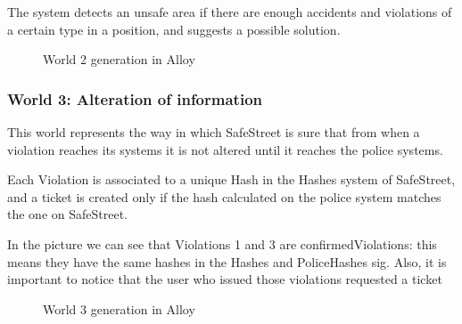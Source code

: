 The system detects an unsafe area if there are enough accidents and violations of a certain type in a position, and
suggests a possible solution.

\clearpage
\begin{figure}
    \noindent{}
    \caption{World 2 generation in Alloy}
\end{figure}
\clearpage

\subsubsection{World 3: Alteration of information}
This world represents the way in which SafeStreet is sure that from when a violation reaches its systems it
is not altered until it reaches the police systems.

Each Violation is associated to a unique Hash in the Hashes system of SafeStreet, and a ticket is created
only if the hash calculated on the police system matches the one on SafeStreet.

In the picture we can see
that Violations 1 and 3 are confirmedViolations: this means they have the same hashes in the Hashes and PoliceHashes sig.
Also, it is important to notice that the user who issued those violations requested a ticket

\clearpage
\begin{figure}
    \noindent{}
    \caption{World 3 generation in Alloy}
\end{figure}
\clearpage